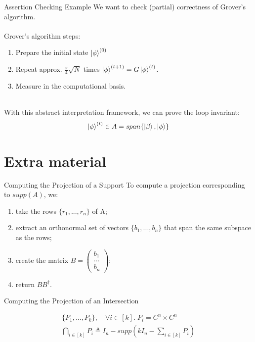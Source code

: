 \documentclass[11pt,svgnames,smaller,aspectratio=43,english]{beamer}
\begin{document}
\begin{frame}{Assertion Checking Example}
	We want to check (partial) correctness of Grover's algorithm.\\\;\\

	{\large \color{blue} Grover's algorithm steps:}
	\begin{enumerate}
		\item Prepare the initial state $\ket{\phi}^{(0)}$
		\item Repeat approx. $\frac{\pi}{4}\sqrt{N}$ times $\ket{\phi}^{(t+1)} = G\ket{\phi}^{(t)}$.
		\item Measure in the computational basis.
	\end{enumerate}\;\\

	With this abstract interpretation framework, we can prove the loop invariant:
	\begin{equation*}
		\ket{\phi}^{(t)} \in A = span\{\ket{\beta}, \ket{\phi}\}
	\end{equation*}
\end{frame}

\section*{Extra material}
\begin{frame}{Computing the Projection of a Support}
	To compute a projection corresponding to $supp(A)$, we:
	\begin{enumerate}
		\item take the rows $\{r_1, ..., r_n\}$ of A;
		\item extract an orthonormal set of vectors $\{b_1, ..., b_n\}$ that span the same subspace as the rows;
		\item create the matrix $B = \begin{pmatrix}
			b_1 \\ ... \\ b_n
		\end{pmatrix}$;
		\item return $BB^\dagger$.
	\end{enumerate}
\end{frame}

\begin{frame}{Computing the Projection of an Intersection}

	\begin{gather*}
		\{P_1, ..., P_k\},\quad \forall i\in [k].\; P_i = C^n \times C^n\\
		\bigcap_{i\in [k]} P_i \triangleq I_n - supp(kI_n - \sum_{i\in [k]} P_i)
	\end{gather*}
\end{frame}
\end{document}

